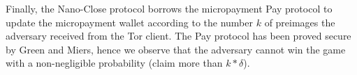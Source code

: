 Finally, the Nano-Close protocol borrows the micropayment Pay protocol to update the micropayment wallet according to the number $k$ of preimages the adversary received from the Tor client. The Pay protocol has been proved secure by Green and Miers, hence we observe that the adversary cannot win the game with a non-negligible probability (claim more than $k*\delta$).

